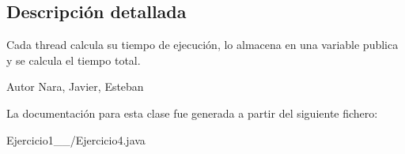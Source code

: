 \subsection{Descripción detallada}
Cada thread calcula su tiempo de ejecución, lo almacena en una variable publica y se calcula el tiempo total. 

\begin{DoxyAuthor}{Autor}
Nara, Javier, Esteban 
\end{DoxyAuthor}


La documentación para esta clase fue generada a partir del siguiente fichero\+:\begin{DoxyCompactItemize}
\item 
Ejercicio1\+\_\+\_/Ejercicio4.\+java\end{DoxyCompactItemize}

